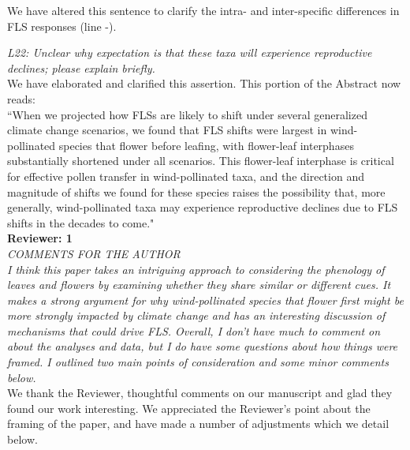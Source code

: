 \documentclass[11pt]{article}
\begin{document}
\noindent We have altered this sentence to clarify the intra- and inter-specific differences in FLS responses (line -).

\emph{L22: Unclear why expectation is that these taxa will experience reproductive declines; please explain briefly.}\\
 
\noindent We have elaborated and clarified this assertion. This portion of the Abstract now reads:\\
 
 ``When we projected how FLSs are likely to shift under several generalized climate change scenarios, we found that FLS shifts were largest in wind-pollinated species that flower before leafing, with flower-leaf interphases substantially shortened under all scenarios. This flower-leaf interphase is critical for effective pollen transfer in wind-pollinated taxa, and the direction and magnitude of shifts we found for these species raises the possibility that, more generally, wind-pollinated taxa may experience reproductive declines due to FLS shifts in the decades to come."\\

\textbf{Reviewer: 1}\\

\emph{COMMENTS FOR THE AUTHOR\\
I think this paper takes an intriguing approach to considering the phenology of leaves and flowers by examining whether they share similar or different cues. It makes a strong argument for why wind-pollinated species that flower first might be more strongly impacted by climate change and has an interesting discussion of mechanisms that could drive FLS. Overall, I don’t have much to comment on about the analyses and data, but I do have some questions about how things were framed. I outlined two main points of consideration and some minor comments below.}\\

We thank the Reviewer, thoughtful comments on our manuscript and glad they found our work interesting. We appreciated the Reviewer's point about the framing of the paper, and have made a number of adjustments which we detail below. \\
\end{document}
